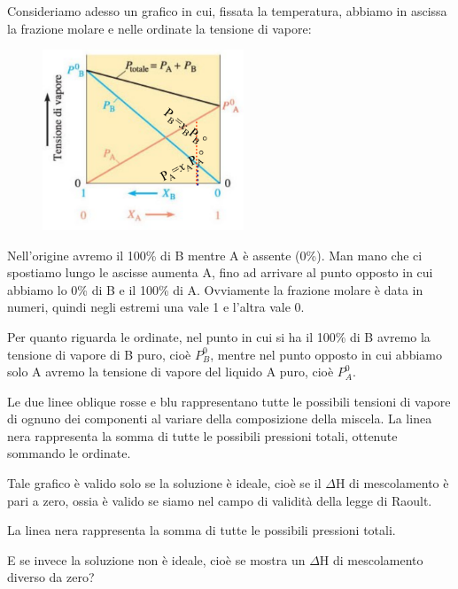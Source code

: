 Consideriamo adesso un grafico in cui, fissata la temperatura, abbiamo in ascissa la frazione molare e nelle ordinate la tensione di vapore:

\begin{minipage}{0.4\textwidth}
    \begin{figure}[H]
        \includegraphics[width=6cm]{immagini/tensione_di_vapore_sol_ideale.png}
    \end{figure}
\end{minipage}
\begin{minipage}{0.6\textwidth}
    Nell'origine avremo il 100\% di B mentre A è assente (0\%). Man mano che ci spostiamo lungo le ascisse aumenta A, fino ad arrivare al punto opposto in cui abbiamo lo 0\% di B e il 100\% di A. Ovviamente la frazione molare è data in numeri, quindi negli estremi una vale 1 e l'altra vale 0.

    Per quanto riguarda le ordinate, nel punto in cui si ha il 100\% di B avremo la tensione di vapore di B puro, cioè $P^0_B$, mentre nel punto opposto in cui abbiamo solo A avremo la tensione di vapore del liquido A puro, cioè $P^0_A$.
\end{minipage}

Le due linee oblique rosse e blu rappresentano tutte le possibili tensioni di vapore di ognuno dei componenti al variare della composizione della miscela. La linea nera rappresenta la somma di tutte le possibili pressioni totali, ottenute sommando le ordinate.

Tale grafico è valido solo se la soluzione è ideale, cioè se il $\Delta$H di mescolamento è pari a zero, ossia è valido se siamo nel campo di validità della legge di Raoult.

La linea nera rappresenta la somma di tutte le possibili pressioni totali.

\vspace{0.2cm}E se invece la soluzione non è ideale, cioè se mostra un $\Delta$H di mescolamento diverso da zero?


